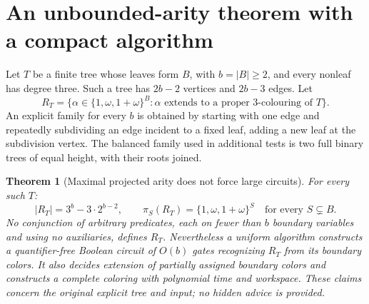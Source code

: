 \documentclass[11pt]{article}
\newtheorem{theorem}{Theorem}
\newcommand{\C}{\{1,\omega,1+\omega\}}
\begin{document}
\section{An unbounded-arity theorem with a compact algorithm}
Let $T$ be a finite tree whose leaves form $B$, with $b=|B|\ge2$, and every
nonleaf has degree three. Such a tree has $2b-2$ vertices and $2b-3$ edges.
Let
\[
 R_T=\{\alpha\in\C^B:\alpha\text{ extends to a proper 3-colouring of }T\}.
\]
An explicit family for every $b$ is obtained by starting with one edge and
repeatedly subdividing an edge incident to a fixed leaf, adding a new leaf
at the subdivision vertex. The balanced family used in additional tests is
two full binary trees of equal height, with their roots joined.

\begin{theorem}[Maximal projected arity does not force large circuits]
For every such $T$:
\begin{equation}\label{eq:count}
 |R_T|=3^b-3\cdot2^{b-2},\qquad
 \pi_S(R_T)=\C^S\quad\text{for every }S\subsetneq B.
\end{equation}
No conjunction of arbitrary predicates, each on fewer than $b$ boundary
variables and using no auxiliaries, defines $R_T$.
Nevertheless a uniform algorithm constructs a quantifier-free Boolean
circuit of $O(b)$ gates recognizing $R_T$ from its boundary colors. It also
decides extension of partially assigned boundary colors and constructs a
complete coloring with polynomial time and workspace. These claims concern
the original explicit tree and input; no hidden advice is provided.
\end{theorem}
\end{document}
